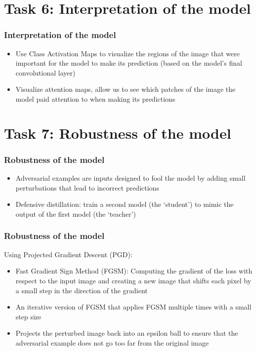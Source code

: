 \documentclass{beamer}
\begin{document}
    \section{Task 6: Interpretation of the model}
        \begin{frame}
        \frametitle{Interpretation of the model}
        \begin{itemize}
            \item Use Class Activation Maps to visualize the regions of the image that were important for the model to make its prediction (based on the model's final convolutional layer)
            \item Visualize attention maps, allow us to see which patches of the image the model paid attention to when making its predictions
        \end{itemize}\par
        \end{frame}
    \section{Task 7: Robustness of the model}
        \begin{frame}
            \frametitle{Robustness of the model}
            \begin{itemize}
                \item Adversarial examples are inputs designed to fool the model by adding small perturbations that lead to incorrect predictions
                \item Defensive distillation: train a second model (the `student') to mimic the output of the first model (the `teacher')
            \end{itemize}\par
        \end{frame}
        \begin{frame}
            \frametitle{Robustness of the model}
            Using Projected Gradient Descent (PGD):
            \begin{itemize}
                \item Fast Gradient Sign Method (FGSM): Computing the gradient of the loss with respect to the input image and creating a new image that shifts each pixel by a small step in the direction of the gradient
                \item An iterative version of FGSM that applies FGSM multiple times with a small step size
                \item Projects the perturbed image back into an epsilon ball to ensure that the adversarial example does not go too far from the original image
            \end{itemize}\par
        \end{frame}
\end{document}
